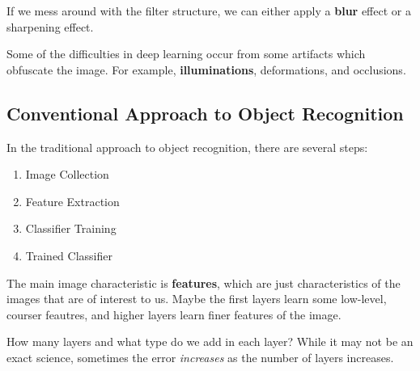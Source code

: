 \documentclass{tufte-handout}
\begin{document}
If we mess around with the filter structure, we can either apply a \textbf{blur} 
effect or a sharpening effect.

Some of the difficulties in deep learning occur from some artifacts which 
obfuscate the image. 
For example, \textbf{illuminations}, deformations, and occlusions.

\subsection{Conventional Approach to Object Recognition}
In the traditional approach to object recognition, there are several steps:
\begin{enumerate}
	\item Image Collection
	\item Feature Extraction
	\item Classifier Training
	\item Trained Classifier
\end{enumerate}

The main image characteristic is \textbf{features}, which are 
just characteristics of the images that are of interest to us.
Maybe the first layers learn some low-level, courser feautres, and 
higher layers learn finer features of the image.

How many layers and what type do we add in each layer?
While it may not be an exact science, sometimes the error \textit{increases}
as the number of layers increases.
\end{document}
